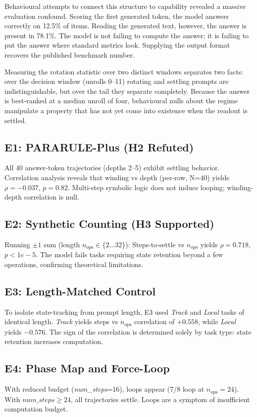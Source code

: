 \documentclass{article}
\begin{document}
Behavioural attempts to connect this structure to capability revealed a massive evaluation confound. Scoring the first generated token, the model answers correctly on 12.5\% of items. Reading the generated text, however, the answer is present in 78.1\%. The model is not failing to compute the answer; it is failing to put the answer where standard metrics look. Supplying the output format recovers the published benchmark number. 

Measuring the rotation statistic over two distinct windows separates two facts: over the decision window (unrolls 0--11) rotating and settling prompts are indistinguishable, but over the tail they separate completely. Because the answer is best-ranked at a median unroll of four, behavioural nulls about the regime manipulate a property that has not yet come into existence when the readout is settled.

\subsection{E1: PARARULE-Plus (H2 Refuted)}
All 40 answer-token trajectories (depths 2--5) exhibit settling behavior. Correlation analysis reveals that winding vs depth (per-row, N=40) yields $\rho = -0.037$, $p = 0.82$. Multi-step symbolic logic does not induce looping; winding-depth correlation is null.

\subsection{E2: Synthetic Counting (H3 Supported)}
Running $\pm1$ sum (length $n_{\text{ops}} \in \{2\ldots 32\}$): Steps-to-settle vs $n_{\text{ops}}$ yields $\rho = 0.718$, $p < 1e-5$. The model fails tasks requiring state retention beyond a few operations, confirming theoretical limitations.

\subsection{E3: Length-Matched Control}
To isolate state-tracking from prompt length, E3 used \textit{Track} and \textit{Local} tasks of identical length. \textit{Track} yields steps vs $n_{\text{ops}}$ correlation of $+0.558$, while \textit{Local} yields $-0.576$. The sign of the correlation is determined solely by task type: state retention increases computation.

\subsection{E4: Phase Map and Force-Loop}
With reduced budget (\textit{num\_steps}=16), loops appear (7/8 loop at $n_{\text{ops}}=24$). With $\textit{num\_steps} \ge 24$, all trajectories settle. Loops are a symptom of insufficient computation budget.
\end{document}

